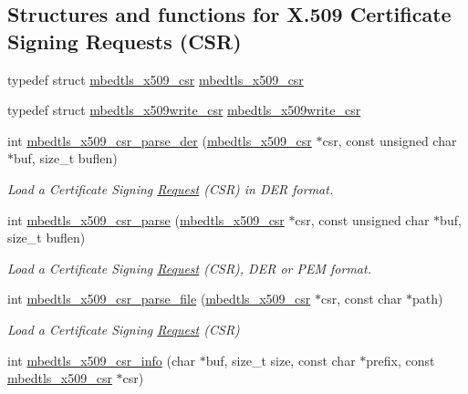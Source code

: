 \subsection*{Structures and functions for X.509 Certificate Signing Requests (C\+SR)}
\begin{DoxyCompactItemize}
\item 
typedef struct \mbox{\hyperlink{structmbedtls__x509__csr}{mbedtls\+\_\+x509\+\_\+csr}} \mbox{\hyperlink{group__x509__module_gae481b23df67001bdac96ef9c2ab3ef7c}{mbedtls\+\_\+x509\+\_\+csr}}
\item 
typedef struct \mbox{\hyperlink{structmbedtls__x509write__csr}{mbedtls\+\_\+x509write\+\_\+csr}} \mbox{\hyperlink{group__x509__module_ga7b0b4f8c5cfd541ee20c53907edb636d}{mbedtls\+\_\+x509write\+\_\+csr}}
\item 
int \mbox{\hyperlink{group__x509__module_ga4c58fa3804ea9feb1acf745221f17208}{mbedtls\+\_\+x509\+\_\+csr\+\_\+parse\+\_\+der}} (\mbox{\hyperlink{structmbedtls__x509__csr}{mbedtls\+\_\+x509\+\_\+csr}} $\ast$csr, const unsigned char $\ast$buf, size\+\_\+t buflen)
\begin{DoxyCompactList}\small\item\em Load a Certificate Signing \mbox{\hyperlink{struct_request}{Request}} (C\+SR) in D\+ER format. \end{DoxyCompactList}\item 
int \mbox{\hyperlink{group__x509__module_ga53012fb8859f4835ccfb0a5e359b3176}{mbedtls\+\_\+x509\+\_\+csr\+\_\+parse}} (\mbox{\hyperlink{structmbedtls__x509__csr}{mbedtls\+\_\+x509\+\_\+csr}} $\ast$csr, const unsigned char $\ast$buf, size\+\_\+t buflen)
\begin{DoxyCompactList}\small\item\em Load a Certificate Signing \mbox{\hyperlink{struct_request}{Request}} (C\+SR), D\+ER or P\+EM format. \end{DoxyCompactList}\item 
int \mbox{\hyperlink{group__x509__module_gaf49db7323eee45d9649600de18d715f8}{mbedtls\+\_\+x509\+\_\+csr\+\_\+parse\+\_\+file}} (\mbox{\hyperlink{structmbedtls__x509__csr}{mbedtls\+\_\+x509\+\_\+csr}} $\ast$csr, const char $\ast$path)
\begin{DoxyCompactList}\small\item\em Load a Certificate Signing \mbox{\hyperlink{struct_request}{Request}} (C\+SR) \end{DoxyCompactList}\item 
int \mbox{\hyperlink{group__x509__module_gaeec330c8cb351adc2870f4f088f36fdc}{mbedtls\+\_\+x509\+\_\+csr\+\_\+info}} (char $\ast$buf, size\+\_\+t size, const char $\ast$prefix, const \mbox{\hyperlink{structmbedtls__x509__csr}{mbedtls\+\_\+x509\+\_\+csr}} $\ast$csr)

\end{DoxyCompactItemize}
